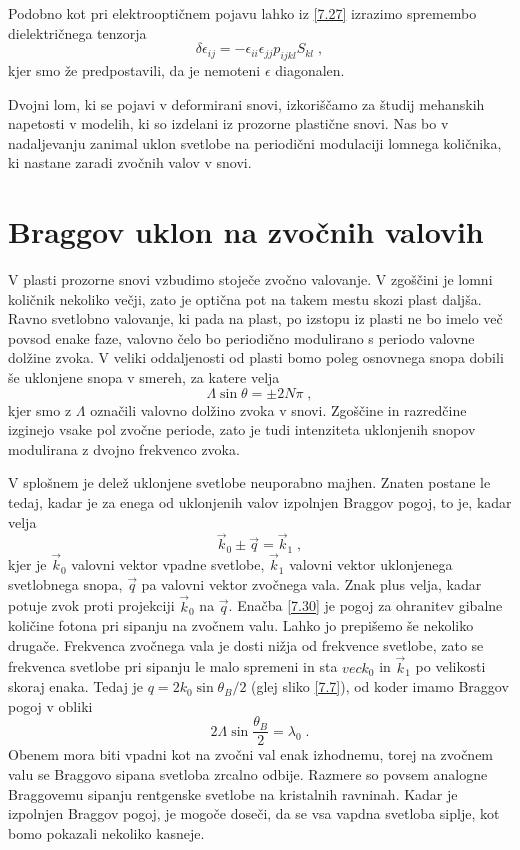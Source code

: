 \documentclass[11pt,fleqn]{book} %
\begin{document}
Podobno kot pri elektrooptičnem pojavu lahko iz \ref{7.27} izrazimo
spremembo dielektričnega tenzorja 
\begin{equation}
\delta\epsilon_{ij}=-\epsilon_{ii}\epsilon_{jj}p_{ijkl}S_{kl}\;,\label{7.29}
\end{equation}
 kjer smo že predpostavili, da je nemoteni $\epsilon$ diagonalen.

Dvojni lom, ki se pojavi v deformirani snovi, izkoriščamo za študij
mehanskih napetosti v modelih, ki so izdelani iz prozorne plastične
snovi. Nas bo v nadaljevanju zanimal uklon svetlobe na periodični
modulaciji lomnega količnika, ki nastane zaradi zvočnih valov v snovi.


\section{Braggov uklon na zvočnih valovih}

V plasti prozorne snovi vzbudimo stoječe zvočno valovanje. V zgoščini
je lomni količnik nekoliko večji, zato je optična pot na takem mestu
skozi plast daljša. Ravno svetlobno valovanje, ki pada na plast, po
izstopu iz plasti ne bo imelo več povsod enake faze, valovno čelo
bo periodično modulirano s periodo valovne dolžine zvoka. V veliki
oddaljenosti od plasti bomo poleg osnovnega snopa dobili še uklonjene
snopa v smereh, za katere velja 
\begin{equation}
\Lambda\sin\theta=\pm2N\pi\;,\label{7.29}
\end{equation}
 kjer smo z $\Lambda$ označili valovno dolžino zvoka v snovi. Zgoščine
in razredčine izginejo vsake pol zvočne periode, zato je tudi intenziteta
uklonjenih snopov modulirana z dvojno frekvenco zvoka.

V splošnem je delež uklonjene svetlobe neuporabno majhen. Znaten postane
le tedaj, kadar je za enega od uklonjenih valov izpolnjen Braggov
pogoj, to je, kadar velja 
\begin{equation}
\vec{k}_{0}\pm\vec{q}=\vec{k}_{1}\;,\label{7.30}
\end{equation}
 kjer je $\vec{k}_{0}$ valovni vektor vpadne svetlobe, $\vec{k}_{1}$
valovni vektor uklonjenega svetlobnega snopa, $\vec{q}$ pa valovni
vektor zvočnega vala. Znak plus velja, kadar potuje zvok proti projekciji
$\vec{k}_{0}$ na $\vec{q}$. Enačba \ref{7.30} je pogoj za ohranitev
gibalne količine fotona pri sipanju na zvočnem valu. Lahko jo prepišemo
še nekoliko drugače. Frekvenca zvočnega vala je dosti nižja od frekvence
svetlobe, zato se frekvenca svetlobe pri sipanju le malo spremeni
in sta $vec{k}_{0}$ in $\vec{k}_{1}$ po velikosti skoraj enaka.
Tedaj je $q=2k_{0}\sin\theta_{B}/2$ (glej sliko \ref{7.7}), od koder
imamo Braggov pogoj v obliki 
\begin{equation}
2\Lambda\sin\frac{\theta_{B}}{2}=\lambda_{0}\;.\label{7.31}
\end{equation}
 Obenem mora biti vpadni kot na zvočni val enak izhodnemu, torej na
zvočnem valu se Braggovo sipana svetloba zrcalno odbije. Razmere so
povsem analogne Braggovemu sipanju rentgenske svetlobe na kristalnih
ravninah. Kadar je izpolnjen Braggov pogoj, je mogoče doseči, da se
vsa vapdna svetloba siplje, kot bomo pokazali nekoliko kasneje.
\end{document}
